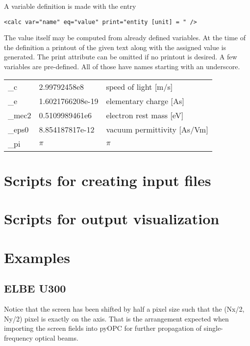 \documentclass[11pt]{article}
\begin{document}
A variable definition is made with the entry
\begin{lstlisting}
<calc var="name" eq="value" print="entity [unit] = " />
\end{lstlisting}
The value itself may be computed from already defined variables.
At the time of the definition a printout of the given text along with the
assigned value is generated. The print attribute can be omitted if no printout is desired.
A few variables are pre-defined. All of those have names starting with an underscore.
\\[1ex]
\begin{tabular}{lll}
\_c & 2.99792458e8 & speed of light [m/s] \\
\_e & 1.6021766208e-19 & elementary charge [As] \\
\_mec2 & 0.5109989461e6 & electron rest mass [eV] \\
\_eps0 & 8.854187817e-12 & vacuum permittivity [As/Vm] \\
\_pi & $\pi$ & $\pi$ \\
\end{tabular}

\section{Scripts for creating input files}

\section{Scripts for output visualization}

\section{Examples}

\subsection{ELBE U300}

Notice that the screen has been shifted by half a pixel size
such that the (Nx/2, Ny/2) pixel is exactly on the axis.
That is the arrangement expected when importing the screen fields into pyOPC
for further propagation of single-frequency optical beams.
\end{document}
